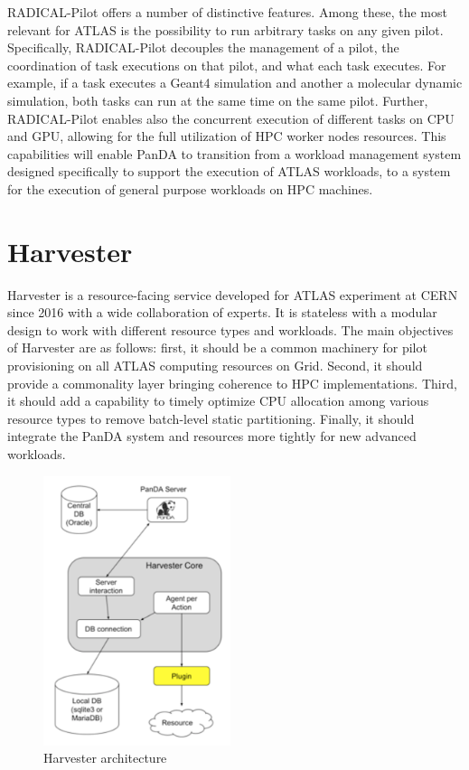 \documentclass{webofc}
\begin{document}
RADICAL-Pilot offers a number of distinctive features. Among these, the most
relevant for ATLAS is the possibility to run arbitrary tasks on any given
pilot. Specifically, RADICAL-Pilot decouples the management of a pilot, the
coordination of task executions on that pilot, and what each task executes.
For example, if a task executes a Geant4 simulation and another a molecular
dynamic simulation, both tasks can run at the same time on the same pilot.
Further, RADICAL-Pilot enables also the concurrent execution of different
tasks on CPU and GPU, allowing for the full utilization of HPC worker nodes
resources. This capabilities will enable PanDA to transition from a workload
management system designed specifically to support the execution of ATLAS
workloads, to a system for the execution of general purpose workloads on HPC
machines.


\section{Harvester}

Harvester \cite{Harvester} is a resource-facing service developed for ATLAS
experiment at CERN since 2016 with a wide collaboration of experts.  It is
stateless with a modular design to work with different resource types and
workloads. The main objectives of Harvester are as follows: first, it should
be a common machinery for pilot provisioning on all ATLAS computing resources
on Grid. Second, it should provide a commonality layer bringing coherence to
HPC implementations. Third, it should add a capability to timely optimize CPU
allocation among various resource types to remove batch-level static
partitioning. Finally, it should integrate the PanDA system and resources
more tightly for new advanced workloads.

\begin{figure}
	\centering
	\includegraphics[width=0.49\textwidth]{figures/panda-harvester-overview.pdf}
	\caption{Harvester architecture}
	\label{fig:harvester-architecture}
\end{figure}
\end{document}
